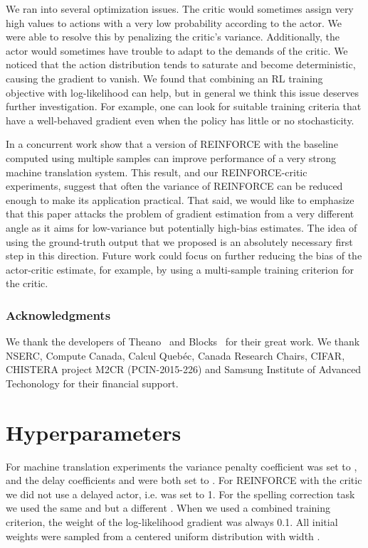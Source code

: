\documentclass{article} \usepackage{iclr2017_conference,times}
\begin{document}
We ran into several optimization issues.
The critic would sometimes assign very high values to
actions with a very low probability according to the actor. We were able to
resolve this by penalizing the critic's variance. Additionally, 
the actor would sometimes have trouble to adapt to the demands of
the critic. We noticed that the action distribution tends to saturate
and become deterministic, causing the gradient to vanish. We found that
combining an RL training objective with log-likelihood can help, but in general
we think this issue deserves further investigation. For example, one can look
for suitable training criteria that have a well-behaved gradient even when the
policy has little or no stochasticity.

In a concurrent work \citet{wu2016google} show that a version of REINFORCE with
the baseline computed using multiple samples can improve performance of a very
strong machine translation system. This result, and our REINFORCE-critic
experiments, suggest that often the variance of REINFORCE can be reduced
enough to make its application practical. That said, we would like to emphasize
that this paper attacks the problem of gradient estimation from a very
different angle as it aims for low-variance but potentially high-bias
estimates. The idea of using the ground-truth output that we proposed is an
absolutely necessary first step in this direction. Future work could focus on
further reducing the bias of the actor-critic estimate, for example, by using a
multi-sample training criterion for the critic.




\subsubsection*{Acknowledgments}
We thank the developers of Theano~\citep{team2016theano} and Blocks~\citep{blocksfuel} for
their great work. We thank NSERC, Compute Canada, Calcul Queb\'ec, Canada Research
Chairs, CIFAR, CHISTERA project M2CR (PCIN-2015-226) and Samsung Institute of Advanced Techonology for their financial support.





\newpage
\appendix
\section{Hyperparameters}
\label{sec:hyperparameters}

For machine translation experiments the variance penalty coefficient 
was set to , and the delay coefficients  and
 were both set to . For REINFORCE with the critic we did not use 
a delayed actor, i.e.  was set to 1. For the spelling correction
task we used the same  and  but a different 
. When we used a combined training criterion, the weight of the log-likelihood gradient  was always 0.1. All initial weights were sampled from a centered uniform distribution with
width .
\end{document}
